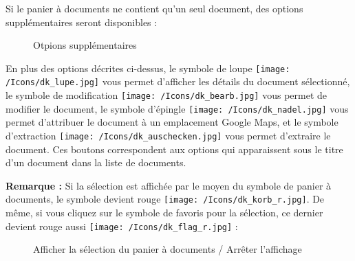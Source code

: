 Si le panier à documents ne contient qu'un seul document, des options supplémentaires seront disponibles :

\begin{figure}[H]
\caption{Otpions supplémentaires}
\end{figure}

En plus des options décrites ci-dessus, le symbole de loupe \texttt{[image: /Icons/dk\_lupe.jpg]}  vous permet d'afficher les détails du document sélectionné, le symbole de modification \texttt{[image: /Icons/dk\_bearb.jpg]}  vous permet de modifier le document, le symbole d'épingle \texttt{[image: /Icons/dk\_nadel.jpg]}  vous permet d'attribuer le document à un emplacement Google Maps, et le symbole d'extraction \texttt{[image: /Icons/dk\_auschecken.jpg]}  vous permet d'extraire le document. Ces boutons correspondent aux options qui apparaissent sous le titre d'un document dans la liste de documents.

\vspace{\baselineskip}

\textbf{Remarque :} Si la sélection est affichée par le moyen du symbole de panier à documents, le symbole devient rouge \texttt{[image: /Icons/dk\_korb\_r.jpg]}. De même, si vous cliquez sur le symbole de favoris pour la sélection, ce dernier devient rouge aussi \texttt{[image: /Icons/dk\_flag\_r.jpg]}  :

\begin{figure}[H]
\caption{Afficher la sélection du panier à documents / Arrêter l'affichage}
\end{figure}

